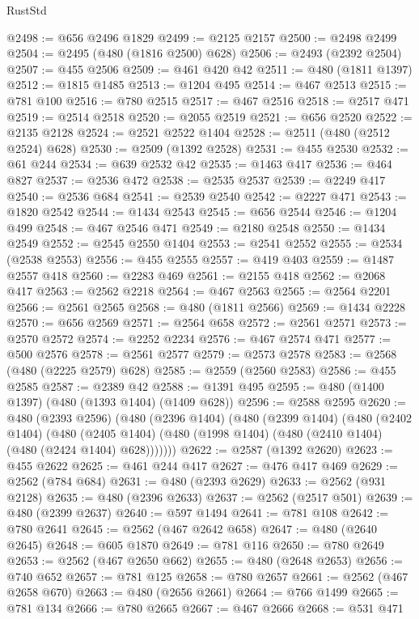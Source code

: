 \begin{lexlean}{RustStd}
\begin{coremodule}
@2498 := @656 @2496 @1829
@2499 := @2125 @2157
@2500 := @2498 @2499
@2504 := @2495 (@480 (@1816 @2500) @628)
@2506 := @2493 (@2392 @2504)
@2507 := @455 @2506
@2509 := @461 @420 @42
@2511 := @480 (@1811 @1397)
@2512 := @1815 @1485
@2513 := @1204 @495
@2514 := @467 @2513
@2515 := @781 @100
@2516 := @780 @2515
@2517 := @467 @2516
@2518 := @2517 @471
@2519 := @2514 @2518
@2520 := @2055 @2519
@2521 := @656 @2520
@2522 := @2135 @2128
@2524 := @2521 @2522 @1404
@2528 := @2511 (@480 (@2512 @2524) @628)
@2530 := @2509 (@1392 @2528)
@2531 := @455 @2530
@2532 := @61 @244
@2534 := @639 @2532 @42
@2535 := @1463 @417
@2536 := @464 @827
@2537 := @2536 @472
@2538 := @2535 @2537
@2539 := @2249 @417
@2540 := @2536 @684
@2541 := @2539 @2540
@2542 := @2227 @471
@2543 := @1820 @2542
@2544 := @1434 @2543
@2545 := @656 @2544
@2546 := @1204 @499
@2548 := @467 @2546 @471
@2549 := @2180 @2548
@2550 := @1434 @2549
@2552 := @2545 @2550 @1404
@2553 := @2541 @2552
@2555 := @2534 (@2538 @2553)
@2556 := @455 @2555
@2557 := @419 @403
@2559 := @1487 @2557 @418
@2560 := @2283 @469
@2561 := @2155 @418
@2562 := @2068 @417
@2563 := @2562 @2218
@2564 := @467 @2563
@2565 := @2564 @2201
@2566 := @2561 @2565
@2568 := @480 (@1811 @2566)
@2569 := @1434 @2228
@2570 := @656 @2569
@2571 := @2564 @658
@2572 := @2561 @2571
@2573 := @2570 @2572
@2574 := @2252 @2234
@2576 := @467 @2574 @471
@2577 := @500 @2576
@2578 := @2561 @2577
@2579 := @2573 @2578
@2583 := @2568 (@480 (@2225 @2579) @628)
@2585 := @2559 (@2560 @2583)
@2586 := @455 @2585
@2587 := @2389 @42
@2588 := @1391 @495
@2595 := @480 (@1400 @1397) (@480 (@1393 @1404) (@1409 @628))
@2596 := @2588 @2595
@2620 := @480
    (@2393 @2596)
    (@480
      (@2396 @1404)
      (@480
        (@2399 @1404)
        (@480
          (@2402 @1404)
          (@480
            (@2405 @1404)
            (@480 (@1998 @1404) (@480 (@2410 @1404) (@480 (@2424 @1404) @628)))))))
@2622 := @2587 (@1392 @2620)
@2623 := @455 @2622
@2625 := @461 @244 @417
@2627 := @476 @417 @469
@2629 := @2562 (@784 @684)
@2631 := @480 (@2393 @2629)
@2633 := @2562 (@931 @2128)
@2635 := @480 (@2396 @2633)
@2637 := @2562 (@2517 @501)
@2639 := @480 (@2399 @2637)
@2640 := @597 @1494
@2641 := @781 @108
@2642 := @780 @2641
@2645 := @2562 (@467 @2642 @658)
@2647 := @480 (@2640 @2645)
@2648 := @605 @1870
@2649 := @781 @116
@2650 := @780 @2649
@2653 := @2562 (@467 @2650 @662)
@2655 := @480 (@2648 @2653)
@2656 := @740 @652
@2657 := @781 @125
@2658 := @780 @2657
@2661 := @2562 (@467 @2658 @670)
@2663 := @480 (@2656 @2661)
@2664 := @766 @1499
@2665 := @781 @134
@2666 := @780 @2665
@2667 := @467 @2666
@2668 := @531 @471

\end{coremodule}
\end{lexlean}
